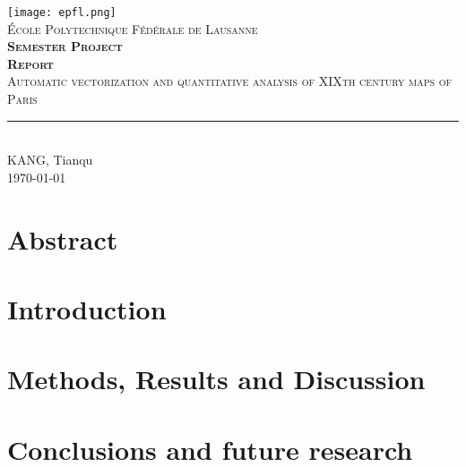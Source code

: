 \documentclass[12pt,titlepage]{report}
\begin{document}
\begin{titlepage}
	\centering
    \texttt{[image: epfl.png]}\\[0.25cm] 	%
    \textsc{\LARGE École Polytechnique Fédérale de Lausanne}\\ \vspace{\fill}
    \textbf{\textsc{\fontsize{40}{40}\selectfont Semester Project}}\\
    \vspace{1cm}	
    \textbf{\textsc{\fontsize{40}{40}\selectfont Report}}\\ \vspace{\fill}		
	\textsc{\LARGE Automatic vectorization and quantitative analysis of XIXth century maps of Paris}\\[0.4cm]
	\rule{\linewidth}{0.2 mm} \\[0.5 cm]
	KANG, Tianqu \\[0.5 cm] \today
\end{titlepage}
\restoregeometry

\thispagestyle{numberonly}




\chapter{Abstract}


\chapter{Introduction}


\chapter{Methods, Results and Discussion}


\chapter{Conclusions and future research}


\printbibliography

\clearpage
\pagestyle{numberonly}
\end{document}
